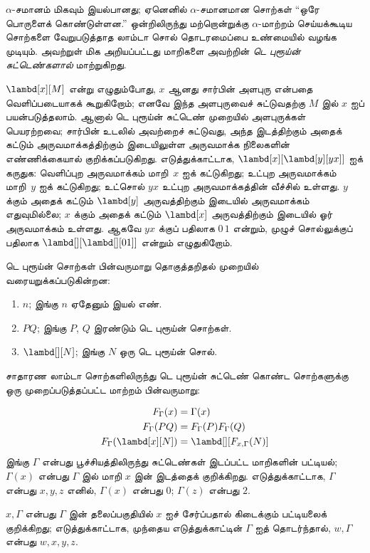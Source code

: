 \documentclass[../../../include/open-logic-section]{subfiles}
\begin{document}


$\alpha$-சமானம் மிகவும் இயல்பானது; ஏனெனில் $\alpha$-சமானமான சொற்கள்
``ஒரே பொருளைக் கொண்டுள்ளன.'' ஒன்றிலிருந்து மற்றொன்றுக்கு $\alpha$-மாற்றம்
செய்யக்கூடிய சொற்களை வேறுபடுத்தாத லாம்டா சொல் தொடரமைப்பை உண்மையில் வழங்க
முடியும். அவற்றுள் மிக அறியப்பட்டது மாறிகளை அவற்றின் \emph{டெ புரூய்ன்
சுட்டெண்களால்} மாற்றுகிறது.

$\lambd[x][M]$ என்று எழுதும்போது, $x$ ஆனது சார்பின் அளபுரு என்பதை
வெளிப்படையாகக் கூறுகிறோம்; எனவே இந்த அளபுருவைச் சுட்டுவதற்கு $M$ இல்
$x$ ஐப் பயன்படுத்தலாம். ஆனால் டெ புரூய்ன் சுட்டெண் முறையில் அளபுருக்கள்
பெயரற்றவை; சார்பின் உடலில் அவற்றைச் சுட்டுவது, அந்த இடத்திற்கும் அதைக் கட்டும்
அருவமாக்கத்திற்கும் இடையிலுள்ள அருவமாக்க நிலைகளின் எண்ணிக்கையால்
குறிக்கப்படுகிறது. எடுத்துக்காட்டாக, $\lambd[x][\lambd[y][y x]]$ ஐக்
கருதுக: வெளிப்புற அருவமாக்கம் மாறி~$x$ ஐக் கட்டுகிறது; உட்புற அருவமாக்கம்
மாறி~$y$ ஐக் கட்டுகிறது; உட்சொல் $y x$ உட்புற அருவமாக்கத்தின் வீச்சில் உள்ளது.
$y$ க்கும் அதைக் கட்டும் $\lambd[y]$ அருவத்திற்கும் இடையில் அருவமாக்கம்
எதுவுமில்லை; $x$ க்கும் அதைக் கட்டும் $\lambd[x]$ அருவத்திற்கும் இடையில் ஓர்
அருவமாக்கம் உள்ளது. ஆகவே $y x$ க்குப் பதிலாக $0\, 1$ என்றும், முழுச்
சொல்லுக்குப் பதிலாக $\lambd[][\lambd[][01]]$ என்றும் எழுதுகிறோம்.

\begin{defn}
  டெ புரூய்ன் சொற்கள் பின்வருமாறு தொகுத்தறிதல் முறையில் வரையறுக்கப்படுகின்றன:
  \begin{enumerate}
  \item $n$; இங்கு $n$ ஏதேனும் இயல் எண்.
  \item $PQ$; இங்கு $P$, $Q$ இரண்டும் டெ புரூய்ன் சொற்கள்.
  \item $\lambd[][N]$; இங்கு $N$ ஒரு டெ புரூய்ன் சொல்.
  \end{enumerate}
\end{defn}

சாதாரண லாம்டா சொற்களிலிருந்து டெ புரூய்ன் சுட்டெண் கொண்ட சொற்களுக்கு ஒரு
முறைப்படுத்தப்பட்ட மாற்றம் பின்வருமாறு:
\begin{defn}
  \begin{align*}
    F_\Gamma(x) &= \Gamma(x) \\
    F_\Gamma(PQ) &= F_\Gamma(P)F_\Gamma(Q) \\
    F_\Gamma(\lambd[x][N]) &= \lambd[][F_{x,\Gamma}(N)]
  \end{align*}
  இங்கு $\Gamma$ என்பது பூச்சியத்திலிருந்து சுட்டெண்கள் இடப்பட்ட மாறிகளின்
  பட்டியல்; $\Gamma(x)$ என்பது $\Gamma$ இல் மாறி $x$ இன் இடத்தைக் குறிக்கிறது.
  எடுத்துக்காட்டாக, $\Gamma$ என்பது $x,y,z$ எனில், $\Gamma(x)$ என்பது $0$;
  $\Gamma(z)$ என்பது $2$.

  $x,\Gamma$ என்பது $\Gamma$ இன் தலைப்பகுதியில் $x$ ஐச் சேர்ப்பதால் கிடைக்கும்
  பட்டியலைக் குறிக்கிறது; எடுத்துக்காட்டாக, முந்தைய எடுத்துக்காட்டின் $\Gamma$
  ஐத் தொடர்ந்தால், $w,\Gamma$ என்பது $w,x,y,z$.
\end{defn}
\end{document}
